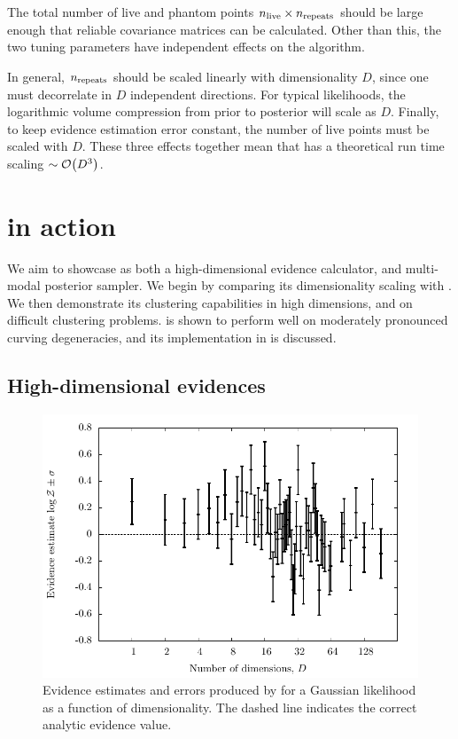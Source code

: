 The total number of live and phantom points \({n_{\mathrm{live}}\times n_{\mathrm{repeats}}}\) should be large enough that reliable covariance matrices can be calculated. Other than this, the two tuning parameters have independent effects on the algorithm. 

In general, \(n_{\mathrm{repeats}}\) should be scaled linearly with dimensionality \(D\), since one must decorrelate in \(D\) independent directions. For typical likelihoods, the logarithmic volume compression from prior to posterior will scale as \(D\). Finally, to keep evidence estimation error constant, the number of live points must be scaled with \(D\). These three effects together mean that \PolyChord{} has a theoretical run time scaling \({\sim\mathcal{O}{\left(D^3\right)}}\).

\section{\PolyChord{} in action}
\label{sec:pc:polychord_in_action}
We aim to showcase \PolyChord{} as both a high-dimensional evidence calculator, and multi-modal posterior sampler. We begin by comparing its dimensionality scaling with \MultiNest{}. We then demonstrate its clustering capabilities in high dimensions, and on difficult clustering problems. \PolyChord{} is shown to perform well on moderately pronounced curving degeneracies, and its implementation in \CosmoMC{} is discussed.

\subsection{High-dimensional evidences}
\label{sec:pc:hi_ev}

\begin{figure}[tp]
  \centering
  \includegraphics[width=\columnwidth]{chapters/polychord/figures/gaussian_evidences}
  \caption{%
    Evidence estimates and errors produced by \PolyChord{} for a Gaussian likelihood as a function of dimensionality. The dashed line indicates the correct analytic evidence value.\label{fig:pc:gaussian_evidences}
}
\end{figure}


